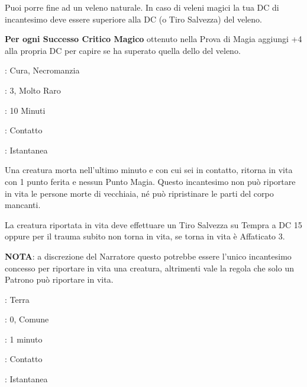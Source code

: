 \begin{multicols}{2}
Puoi porre fine ad un veleno naturale. In caso di veleni magici la tua DC di incantesimo deve essere superiore alla DC (o Tiro Salvezza) del veleno.

\textbf{Per ogni Successo Critico Magico} ottenuto nella Prova di Magia aggiungi +4 alla propria DC per capire se ha superato quella dello del veleno.

\noindent\colorbox{OBSSgold!10}{
\begin{minipage}{0.95\linewidth}
\begin{description}[noitemsep, topsep=0pt, parsep=0pt, partopsep=0pt, leftmargin=0cm, labelwidth=1.3cm]
	\item[\textbf{Lista}]: Cura, Necromanzia
	\item[\textbf{Livello}]: 3, Molto Raro
	\item[\textbf{Lancio}]: 10 Minuti
	\item[\textbf{Gittata}]: Contatto
	\item[\textbf{Durata}]: Istantanea
\end{description}
\end{minipage}}\smallskip

Una creatura morta nell'ultimo minuto e con cui sei in contatto, ritorna in vita con 1 punto ferita e nessun Punto Magia. Questo incantesimo non può riportare in vita le persone morte di vecchiaia, né può ripristinare le parti del corpo mancanti.

La creatura riportata in vita deve effettuare un Tiro Salvezza su Tempra a DC 15 oppure per il trauma subito non torna in vita, se torna in vita è Affaticato 3.

\textbf{NOTA}: a discrezione del Narratore questo potrebbe essere l'unico incantesimo concesso per riportare in vita una creatura, altrimenti vale la regola che solo un Patrono può riportare in vita.

\noindent\colorbox{OBSSgold!10}{
\begin{minipage}{0.95\linewidth}
\begin{description}[noitemsep, topsep=0pt, parsep=0pt, partopsep=0pt, leftmargin=0cm, labelwidth=1.3cm]
	\item[\textbf{Lista}]: Terra
	\item[\textbf{Livello}]: 0, Comune
	\item[\textbf{Lancio}]: 1 minuto
	\item[\textbf{Gittata}]: Contatto
	\item[\textbf{Durata}]: Istantanea
\end{description}
\end{minipage}}\smallskip


\end{multicols}
